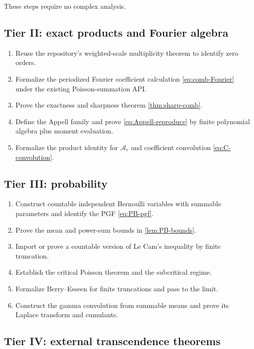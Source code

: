 \documentclass[11pt,oneside]{article}
\theoremstyle{definition}
\theoremstyle{remark}
\newcommand{\Ar}{\mathcal A}
\begin{document}
These steps require no complex analysis.

\subsection{Tier II: exact products and Fourier algebra}

\begin{enumerate}
\item Reuse the repository's weighted-scale multiplicity theorem to identify
zero orders.
\item Formalize the periodized Fourier coefficient calculation
\eqref{eq:comb-Fourier} under the existing Poisson-summation API.
\item Prove the exactness and sharpness theorem \ref{thm:sharp-comb}.
\item Define the Appell family and prove \eqref{eq:Appell-reproduce} by finite
polynomial algebra plus moment evaluation.
\item Formalize the product identity for $\Ar_r$ and coefficient convolution
\eqref{eq:C-convolution}.
\end{enumerate}

\subsection{Tier III: probability}

\begin{enumerate}
\item Construct countable independent Bernoulli variables with summable
parameters and identify the PGF \eqref{eq:PB-pgf}.
\item Prove the mean and power-sum bounds in \cref{lem:PB-bounds}.
\item Import or prove a countable version of Le Cam's inequality by finite
truncation.
\item Establish the critical Poisson theorem and the subcritical regime.
\item Formalize Berry--Esseen for finite truncations and pass to the limit.
\item Construct the gamma convolution from summable means and prove its
Laplace transform and cumulants.
\end{enumerate}

\subsection{Tier IV: external transcendence theorems}
\end{document}
